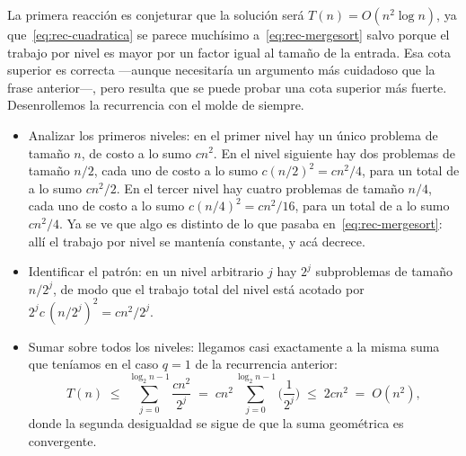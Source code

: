 \documentclass[12pt, spanish, oneside, openany]{book}
\theoremstyle{uprightplain}
\theoremstyle{definition}
\theoremstyle{remark}
\theoremstyle{definition}
\begin{document}
La primera reacción es conjeturar que la solución será $T(n)=O(n^2\log n)$, ya que~\eqref{eq:rec-cuadratica} se parece muchísimo a~\eqref{eq:rec-mergesort} salvo porque el trabajo por nivel es mayor por un factor igual al tamaño de la entrada. Esa cota superior es correcta ---aunque necesitaría un argumento más cuidadoso que la frase anterior---, pero resulta que se puede probar una cota superior más fuerte. Desenrollemos la recurrencia con el molde de siempre.

\begin{itemize}
    \item Analizar los primeros niveles: en el primer nivel hay un único problema de tamaño $n$, de costo a lo sumo $cn^2$. En el nivel siguiente hay dos problemas de tamaño $n/2$, cada uno de costo a lo sumo $c(n/2)^2=cn^2/4$, para un total de a lo sumo $cn^2/2$. En el tercer nivel hay cuatro problemas de tamaño $n/4$, cada uno de costo a lo sumo $c(n/4)^2=cn^2/16$, para un total de a lo sumo $cn^2/4$. Ya se ve que algo es distinto de lo que pasaba en~\eqref{eq:rec-mergesort}: allí el trabajo por nivel se mantenía constante, y acá decrece.

    \item Identificar el patrón: en un nivel arbitrario $j$ hay $2^j$ subproblemas de tamaño $n/2^j$, de modo que el trabajo total del nivel está acotado por $2^j c\,(n/2^j)^2 = cn^2/2^j$.

    \item Sumar sobre todos los niveles: llegamos casi exactamente a la misma suma que teníamos en el caso $q=1$ de la recurrencia anterior:
    \[
    T(n)\;\le\;\sum_{j=0}^{\log_2 n-1}\frac{cn^2}{2^j}
           \;=\; cn^2\sum_{j=0}^{\log_2 n-1}\Big(\frac{1}{2^j}\Big)
           \;\le\; 2cn^2 \;=\; O(n^2),
    \]
    donde la segunda desigualdad se sigue de que la suma geométrica es convergente.
\end{itemize}
\end{document}
